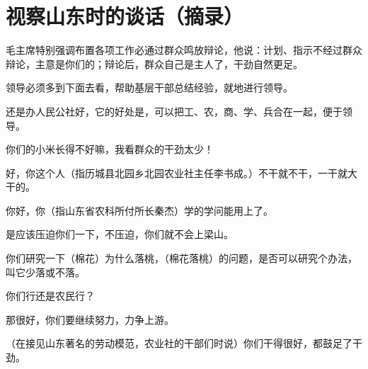 \section[视察山东时的谈话（摘录）（一九五八年八月九日）]{视察山东时的谈话（摘录）}


毛主席特别强调布置各项工作必通过群众鸣放辩论，他说：计划、指示不经过群众辩论，主意是你们的；辩论后，群众自己是主人了，干劲自然更足。

领导必须多到下面去看，帮助基层干部总结经验，就地进行领导。

还是办人民公社好，它的好处是，可以把工、农，商、学、兵合在一起，便于领导。

你们的小米长得不好嘛，我看群众的干劲太少！

好，你这个人（指历城县北园乡北园农业社主任李书成。）不干就不干，一干就大干的。

你好，你（指山东省农科所付所长秦杰）学的学问能用上了。

是应该压迫你们一下，不压迫，你们就不会上梁山。

你们研究一下（棉花）为什么落桃，（棉花落桃）的问题，是否可以研究个办法，叫它少落或不落。

你们行还是农民行？

那很好，你们要继续努力，力争上游。

（在接见山东著名的劳动模范，农业社的干部们时说）你们干得很好，都鼓足了干劲。


